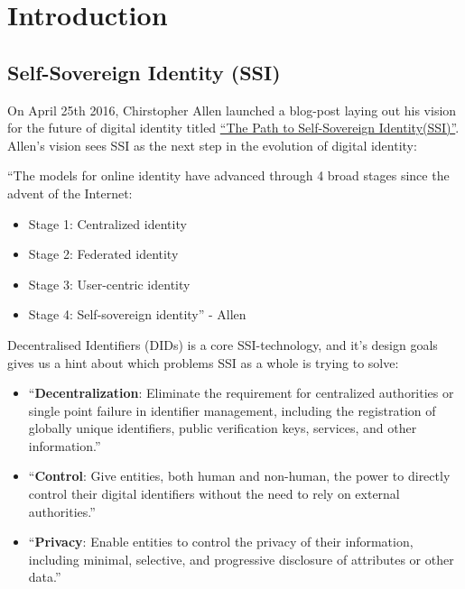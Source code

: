 \hypertarget{introduction}{%
\chapter{Introduction}\label{introduction}}

\hypertarget{ssi-background}{%
\section{Self-Sovereign Identity (SSI)}\label{ssi-background}}

On April 25th 2016, Chirstopher Allen launched a blog-post laying out
his vision for the future of digital identity titled
\href{http://www.lifewithalacrity.com/2016/04/the-path-to-self-soverereign-identity.html}{``The
Path to Self-Sovereign Identity(SSI)''}. Allen's vision sees SSI as the next
step in the evolution of digital identity: 

``The models for online
identity have advanced through 4 broad stages since the advent of the
Internet:

\begin{itemize}
\tightlist
\item
  Stage 1: Centralized identity
\item
  Stage 2: Federated identity
\item
  Stage 3: User-centric identity
\item
  Stage 4: Self-sovereign identity'' - Allen
\end{itemize}

Decentralised Identifiers (DIDs) is a core SSI-technology, and it's
design goals gives us a hint about which problems SSI as a whole is
trying to solve:

\begin{itemize}
\tightlist
\item
  ``\textbf{Decentralization}: Eliminate the requirement for centralized
  authorities or single point failure in identifier management,
  including the registration of globally unique identifiers, public
  verification keys, services, and other information.''
\item
  ``\textbf{Control}: Give entities, both human and non-human, the power
  to directly control their digital identifiers without the need to rely
  on external authorities.''
\item
  ``\textbf{Privacy}: Enable entities to control the privacy of their
  information, including minimal, selective, and progressive disclosure
  of attributes or other data.''
\end{itemize}


